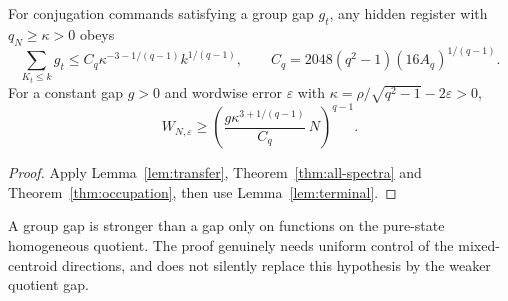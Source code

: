 \begin{corollary}\label{cor:conjugation}
For conjugation commands satisfying a group gap $g_t$, any hidden
register with $q_N\ge\kappa>0$ obeys
\begin{equation}\label{eq:conjugation-budget}
 \sum_{K_t\le k}g_t
 \le C_q\kappa^{-3-1/(q-1)}k^{1/(q-1)},\qquad
 C_q=2048(q^2-1)(16A_q)^{1/(q-1)}.
\end{equation}
For a constant gap $g>0$ and wordwise error $\varepsilon$ with
$\kappa=\rho/\sqrt{q^2-1}-2\varepsilon>0$,
\begin{equation}\label{eq:q-lower}
 W_{N,\varepsilon}\ge
 \left(\frac{g\kappa^{3+1/(q-1)}}{C_q}\,N\right)^{q-1}.
\end{equation}
\end{corollary}
\begin{proof}
Apply Lemma~\ref{lem:transfer}, Theorem~\ref{thm:all-spectra} and
Theorem~\ref{thm:occupation}, then use Lemma~\ref{lem:terminal}.
\end{proof}
A group gap is stronger than a gap only on functions on the pure-state
homogeneous quotient. The proof genuinely needs uniform control of the
mixed-centroid directions, and does not silently replace this hypothesis
by the weaker quotient gap.
